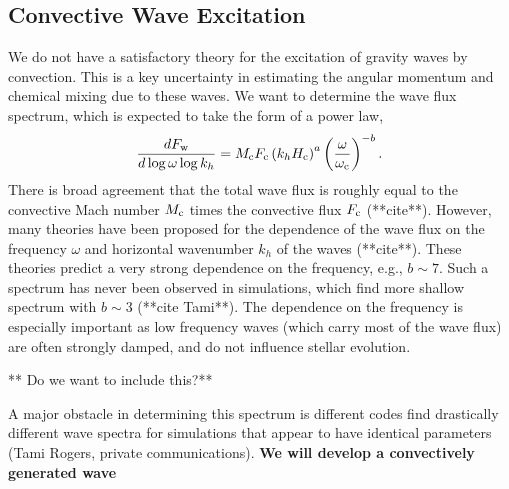 {\color{purple}
\subsection{Convective Wave Excitation}
}

We do not have a satisfactory theory for the excitation of gravity waves by convection. This is a key uncertainty in estimating the angular momentum and chemical mixing due to these waves. We want to determine the wave flux spectrum, which is expected to take the form of a power law,
\begin{equation}
\frac{d F_{\rm w}}{d\log \omega \log k_h} = M_{\rm c}F_{\rm c} \left(k_h H_{\rm c}\right)^{a} \left(\frac{\omega}{\omega_{\rm c}}\right)^{-b}.
\end{equation}
There is broad agreement that the total wave flux is roughly equal to the convective Mach number $M_{\rm c}$ times the convective flux $F_{\rm c}$ (**cite**). However, many theories have been proposed for the dependence of the wave flux on the frequency $\omega$ and horizontal wavenumber $k_h$ of the waves (**cite**). These theories predict a very strong dependence on the frequency, e.g., $b\sim 7$. Such a spectrum has never been observed in simulations, which find more shallow spectrum with $b\sim 3$ (**cite Tami**). The dependence on the frequency is especially important as low frequency waves (which carry most of the wave flux) are often strongly damped, and do not influence stellar evolution. 

** Do we want to include this?**

A major obstacle in determining this spectrum is different codes find drastically different wave spectra for simulations that appear to have identical parameters (Tami Rogers, private communications). \textbf{We will develop a convectively generated wave }
